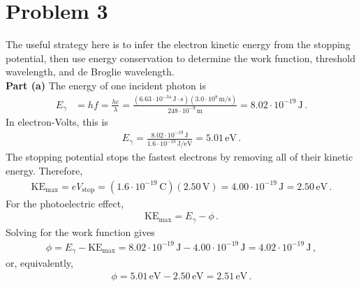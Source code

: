 \documentclass[11pt]{article}
\begin{document}
\section*{Problem 3}
The useful strategy here is to infer the electron kinetic energy from the stopping potential, then use energy conservation to determine the work function, threshold wavelength, and de Broglie wavelength.\\

\noindent\textbf{Part (a)} The energy of one incident photon is
\begin{align*}
E_\gamma
&=hf=\frac{hc}{\lambda}=\frac{(6.63\cdot 10^{-34}\,\text{J}\cdot\text{s})(3.0\cdot 10^8\,\text{m/s})}
{248\cdot 10^{-9}\,\text{m}}=8.02\cdot 10^{-19}\,\text{J}\,.
\end{align*}
In electron-Volts, this is
\begin{align*}
E_\gamma
=\frac{8.02\cdot 10^{-19}\,\text{J}}
{1.6\cdot 10^{-19}\,\text{J/eV}}
=5.01\,\text{eV}\,.
\end{align*}
The stopping potential stops the fastest electrons by removing all of their kinetic energy. Therefore,
\begin{align*}
\text{KE}_{\max}=eV_{\text{stop}}=(1.6\cdot 10^{-19}\,\text{C})(2.50\,\text{V})=4.00\cdot 10^{-19}\,\text{J}=2.50\,\text{eV}\,.
\end{align*}
For the photoelectric effect,
\begin{align*}
\text{KE}_{\max}=E_\gamma-\phi\,.
\end{align*}
Solving for the work function gives
\begin{align*}
\phi
=E_\gamma-\text{KE}_{\max}=8.02\cdot 10^{-19}\,\text{J}
-4.00\cdot 10^{-19}\,\text{J}=4.02\cdot 10^{-19}\,\text{J}\,,
\end{align*}
or, equivalently,
\begin{align*}
\phi=5.01\,\text{eV}-2.50\,\text{eV}
=2.51\,\text{eV}\,.
\end{align*}
\end{document}
